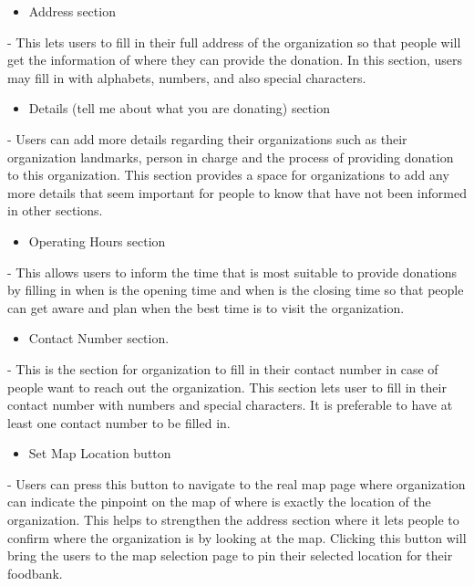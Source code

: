 \documentclass[conference]{IEEEtran}
\begin{document}
\begin{itemize}
\item Address section
\end{itemize}
- This lets users to fill in their full address of the organization so that people will get the information of where they can provide the donation. In this section, users may fill in with alphabets, numbers, and also special characters. \\
 
\begin{itemize}
\item Details (tell me about what you are donating) section
\end{itemize}
- Users can add more details regarding their organizations such as their organization landmarks, person in charge and the process of providing donation to this organization. This section provides a space for organizations to add any more details that seem important for people to know that have not been informed in other sections. \\

\begin{itemize}
\item Operating Hours section
\end{itemize}
- This allows users to inform the time that is most suitable to provide donations by filling in when is the opening time and when is the closing time so that people can get aware and plan when the best time is to visit the organization.\\

\begin{itemize}
\item Contact Number section.
\end{itemize}
- This is the section for organization to fill in their contact number in case of people want to reach out the organization. This section lets user to fill in their contact number with numbers and special characters. It is preferable to have at least one contact number to be filled in.\\

\begin{itemize}
\item Set Map Location button 
\end{itemize}
- Users can press this button to navigate to the real map page where organization can indicate the pinpoint on the map of where is exactly the location of the organization. This helps to strengthen the address section where it lets people to confirm where the organization is by looking at the map. Clicking this button will bring the users to the map selection page to pin their selected location for their foodbank. \\
\end{document}
